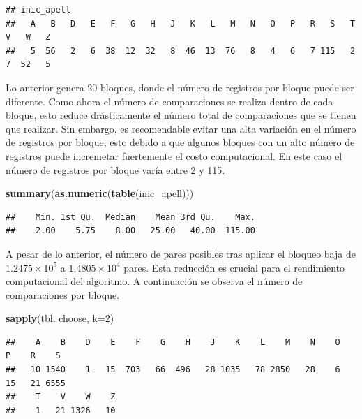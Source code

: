 \documentclass[
  12pt,
]{book}
\newenvironment{Shaded}{\begin{snugshade}}{\end{snugshade}}
\newcommand{\AttributeTok}[1]{\textcolor[rgb]{0.13,0.29,0.53}{#1}}
\newcommand{\DecValTok}[1]{\textcolor[rgb]{0.00,0.00,0.81}{#1}}
\newcommand{\FunctionTok}[1]{\textcolor[rgb]{0.13,0.29,0.53}{\textbf{#1}}}
\newcommand{\NormalTok}[1]{#1}
\begin{document}
\begin{verbatim}
## inic_apell
##   A   B   D   E   F   G   H   J   K   L   M   N   O   P   R   S   T   V   W   Z 
##   5  56   2   6  38  12  32   8  46  13  76   8   4   6   7 115   2   7  52   5
\end{verbatim}

Lo anterior genera 20 bloques, donde el número de registros por bloque puede ser diferente. Como ahora el número de comparaciones se realiza dentro de cada bloque, esto reduce drásticamente el número total de comparaciones que se tienen que realizar. Sin embargo, es recomendable evitar una alta variación en el número de registros por bloque, esto debido a que algunos bloques con un alto número de registros puede incremetar fuertemente el costo computacional. En este caso el número de registros por bloque varía entre 2 y 115.

\begin{Shaded}
\begin{Highlighting}[]
\FunctionTok{summary}\NormalTok{(}\FunctionTok{as.numeric}\NormalTok{(}\FunctionTok{table}\NormalTok{(inic\_apell)))}
\end{Highlighting}
\end{Shaded}

\begin{verbatim}
##    Min. 1st Qu.  Median    Mean 3rd Qu.    Max. 
##    2.00    5.75    8.00   25.00   40.00  115.00
\end{verbatim}

A pesar de lo anterior, el número de pares posibles tras aplicar el bloqueo baja de \ensuremath{1.2475\times 10^{5}} a \ensuremath{1.4805\times 10^{4}} pares. Esta reducción es crucial para el rendimiento computacional del algoritmo. A continuación se observa el número de comparaciones por bloque.

\begin{Shaded}
\begin{Highlighting}[]
\FunctionTok{sapply}\NormalTok{(tbl, choose, }\AttributeTok{k=}\DecValTok{2}\NormalTok{)}
\end{Highlighting}
\end{Shaded}

\begin{verbatim}
##    A    B    D    E    F    G    H    J    K    L    M    N    O    P    R    S 
##   10 1540    1   15  703   66  496   28 1035   78 2850   28    6   15   21 6555 
##    T    V    W    Z 
##    1   21 1326   10
\end{verbatim}
\end{document}
